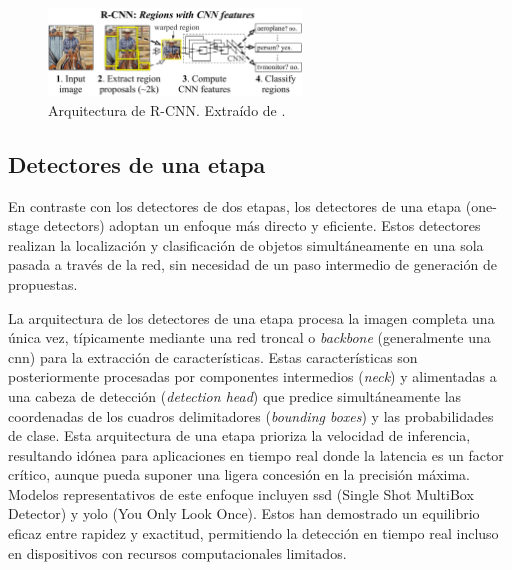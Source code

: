 \documentclass[11pt,spanish,listoffigures,listoftables]{tfgetsinf}
\begin{document}
\begin{figure}[H]
   \centering
   \includegraphics[width=0.6\textwidth]{images/estado_del_arte/R-CNN.png}
   \caption[Arquitectura de R-CNN]{Arquitectura de R-CNN. Extraído de \cite[fig. 1, p. ~1]{girshick2014richfeaturehierarchiesaccurate}.}
   \label{fig:r-cnn}
\end{figure}

\subsection{Detectores de una etapa}\label{sec:one_stage_detectors}

En contraste con los detectores de dos etapas, los detectores de una etapa (one-stage detectors) adoptan un enfoque más directo y eficiente. Estos detectores realizan la localización y clasificación de objetos simultáneamente en una sola pasada a través de la red, sin necesidad de un paso intermedio de generación de propuestas.

La arquitectura de los detectores de una etapa procesa la imagen completa una única vez, típicamente mediante una red troncal o \textit{backbone} (generalmente una \gls{cnn}) para la extracción de características. Estas características son posteriormente procesadas por componentes intermedios (\textit{neck}) y alimentadas a una cabeza de detección (\textit{detection head}) que predice simultáneamente las coordenadas de los cuadros delimitadores (\textit{bounding boxes}) y las probabilidades de clase.
Esta arquitectura de una etapa prioriza la velocidad de inferencia, resultando idónea para aplicaciones en tiempo real donde la latencia es un factor crítico, aunque pueda suponer una ligera concesión en la precisión máxima. Modelos representativos de este enfoque incluyen \gls{ssd} (Single Shot MultiBox Detector)\cite{Liu_2016} y \gls{yolo} (You Only Look Once)\cite{redmon2016lookonceunifiedrealtime}. Estos han demostrado un equilibrio eficaz entre rapidez y exactitud, permitiendo la detección en tiempo real incluso en dispositivos con recursos computacionales limitados.
\end{document}
